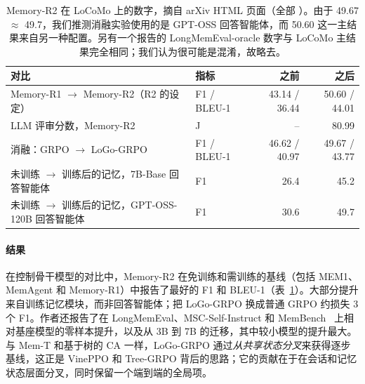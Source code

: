 \begin{table}[t]
\centering\small
\caption{Memory-R2 在 LoCoMo 上的数字，摘自 arXiv HTML 页面（全部 \unverified）。由于 49.67 $\approx$ 49.7，我们推测消融实验使用的是 GPT-OSS 回答智能体，而 50.60 这一主结果来自另一种配置。另有一个报告的 LongMemEval-oracle 数字与 LoCoMo 主结果完全相同；我们认为很可能是混淆，故略去。}
\label{tab:memr2}
\begin{tabularx}{\textwidth}{@{}X l r r@{}}
\toprule
对比 & 指标 & 之前 & 之后 \\
\midrule
Memory-R1 $\to$ Memory-R2（R2 的设定） & F1 / BLEU-1 & 43.14 / 36.44 & 50.60 / 44.01 \\
\quad LLM 评审分数，Memory-R2 & J & -- & 80.99 \\
消融：GRPO $\to$ LoGo-GRPO & F1 / BLEU-1 & 46.62 / 40.97 & 49.67 / 43.77 \\
未训练 $\to$ 训练后的记忆，7B-Base 回答智能体 & F1 & 26.4 & 45.2 \\
未训练 $\to$ 训练后的记忆，GPT-OSS-120B 回答智能体 & F1 & 30.6 & 49.7 \\
\bottomrule
\end{tabularx}
\end{table}

\paragraph{结果}
在控制骨干模型的对比中，Memory-R2 在免训练和需训练的基线（包括 MEM1、MemAgent 和 Memory-R1）中报告了最好的 F1 和 BLEU-1（表~\ref{tab:memr2}）。大部分提升来自训练记忆模块，而非回答智能体；把 LoGo-GRPO 换成普通 GRPO 约损失 3 个 F1。作者还报告了在 LongMemEval、MSC-Self-Instruct 和 MemBench~\citep{tan2025membench} 上相对基座模型的零样本提升，以及从 3B 到 7B 的迁移，其中较小模型的提升最大\unverified。与 Mem-T 和基于树的 CA 一样，LoGo-GRPO 通过\emph{从共享状态分叉}来获得逐步基线，这正是 VinePPO 和 Tree-GRPO 背后的思路；它的贡献在于在会话和记忆状态层面分叉，同时保留一个端到端的全局项。


